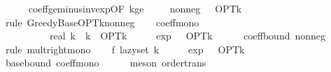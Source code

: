\begin{isabellebody}
\ \ \ \ \isamarkupfalse%
\ coeff{\isacharunderscore}{\kern0pt}ge{\isacharunderscore}{\kern0pt}{}{\isacharunderscore}{\kern0pt}minus{\isacharunderscore}{\kern0pt}inv{\isacharunderscore}{\kern0pt}exp{\isacharbrackleft}{\kern0pt}OF\ k{\isacharunderscore}{\kern0pt}ge{}{\isacharbrackright}{\kern0pt}\ \isakeywordONE{{\isachardot}{\kern0pt}}\isamarkupfalse%
\isanewline
\isanewline
\ \ \isamarkupfalse%
\ nonneg{\isacharcolon}{\kern0pt}\ {\isachardoublequoteopen}{}\ {\isasymle}\ OPT{\isacharunderscore}{\kern0pt}k{\isachardoublequoteclose}\isanewline
\ \ \ \ \isamarkupfalse%
\ {\isacharparenleft}{\kern0pt}rule\ Greedy{\isacharunderscore}{\kern0pt}Base{\isachardot}{\kern0pt}OPT{\isacharunderscore}{\kern0pt}k{\isacharunderscore}{\kern0pt}nonneg{\isacharparenright}{\kern0pt}\isanewline
\isanewline
\ \ \isamarkupfalse%
\ coeff{\isacharunderscore}{\kern0pt}mono{\isacharcolon}{\kern0pt}\isanewline
\ \ \ \ {\isachardoublequoteopen}{\isacharparenleft}{\kern0pt}{}\ {\isacharminus}{\kern0pt}\ {\isacharparenleft}{\kern0pt}{}\ {\isacharminus}{\kern0pt}\ {}\ {\isacharslash}{\kern0pt}\ real\ k{\isacharparenright}{\kern0pt}\ {\isacharcircum}{\kern0pt}\ k{\isacharparenright}{\kern0pt}\ {\isacharasterisk}{\kern0pt}\ OPT{\isacharunderscore}{\kern0pt}k\ {\isasymge}\ {\isacharparenleft}{\kern0pt}{}\ {\isacharminus}{\kern0pt}\ {}\ {\isacharslash}{\kern0pt}\ exp\ {}{\isacharparenright}{\kern0pt}\ {\isacharasterisk}{\kern0pt}\ OPT{\isacharunderscore}{\kern0pt}k{\isachardoublequoteclose}\isanewline
\ \ \ \ \isamarkupfalse%
\ coeff{\isacharunderscore}{\kern0pt}bound\ nonneg\isanewline
\ \ \ \ \isamarkupfalse%
\ {\isacharparenleft}{\kern0pt}rule\ mult{\isacharunderscore}{\kern0pt}right{\isacharunderscore}{\kern0pt}mono{\isacharparenright}{\kern0pt}\isanewline
\isanewline
\ \ \isamarkupfalse%
\ {\isachardoublequoteopen}f\ {\isacharparenleft}{\kern0pt}lazy{\isacharunderscore}{\kern0pt}set\ k{\isacharparenright}{\kern0pt}\ {\isasymge}\ {\isacharparenleft}{\kern0pt}{}\ {\isacharminus}{\kern0pt}\ {}\ {\isacharslash}{\kern0pt}\ exp\ {}{\isacharparenright}{\kern0pt}\ {\isacharasterisk}{\kern0pt}\ OPT{\isacharunderscore}{\kern0pt}k{\isachardoublequoteclose}\isanewline
\ \ \ \ \isamarkupfalse%
\ base{\isacharunderscore}{\kern0pt}bound\ coeff{\isacharunderscore}{\kern0pt}mono\isanewline
\ \ \ \ \isamarkupfalse%
\ {\isacharparenleft}{\kern0pt}meson\ order{\isacharunderscore}{\kern0pt}trans{\isacharparenright}{\kern0pt}\isanewline
{}\isamarkupfalse%
%
\endisatagproof
{\isafoldproof}%
%
\isadelimproof
\isanewline
%
\endisadelimproof
\isanewline
{}\isamarkupfalse%
\isanewline
%
\isadelimtheory
\isanewline
%
\endisadelimtheory
%
\isatagtheory
{}\isamarkupfalse%
%
\endisatagtheory
{\isafoldtheory}%
%
\isadelimtheory
%
\endisadelimtheory
%
\end{isabellebody}%

